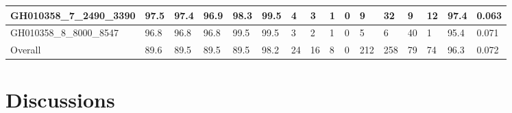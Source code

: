 \begin{table}[]
{\begin{tabular}{|l|l|l|l|l|l|l|l|l|l|l|l|l|l|l|l|}
			GH010358\_7\_2490\_3390   & 97.5       & 97.4      & 96.9      & 98.3                                                   & 99.5                                                   & 4    & 3                                                    & 1                                                    & 0                                                    & 9    & 32   & 9                                                     & 12                                                   & 97.4       & 0.063  \\ \hline
			GH010358\_8\_8000\_8547   & 96.8       & 96.8      & 96.8      & 99.5                                                   & 99.5                                                   & 3    & 2                                                    & 1                                                    & 0                                                    & 5    & 6    & 40                                                    & 1                                                    & 95.4       & 0.071  \\ \hline
			Overall                   & 89.6       & 89.5      & 89.5      & 89.5                                                   & 98.2                                                   & 24   & 16                                                   & 8                                                    & 0                                                    & 212  & 258  & 79                                                    & 74                                                   & 96.3       & 0.072  \\ \hline
		\end{tabular}%
	}
\end{table}
\section{Discussions}
